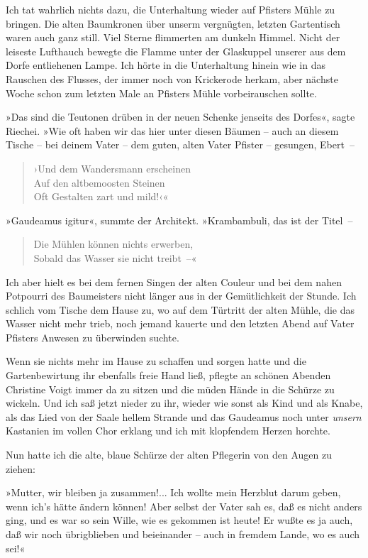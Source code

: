 Ich tat wahrlich nichts dazu, die Unterhaltung wieder auf Pfisters
Mühle zu bringen. Die alten Baumkronen über unserm vergnügten,
letzten Gartentisch waren auch ganz still. Viel Sterne flimmerten
am dunkeln Himmel. Nicht der leiseste Lufthauch bewegte die Flamme
unter der Glaskuppel unserer aus dem Dorfe entliehenen Lampe. Ich
hörte in die Unterhaltung hinein wie in das Rauschen des Flusses,
der immer noch von Krickerode herkam, aber nächste Woche schon zum
letzten Male an Pfisters Mühle vorbeirauschen sollte.

»Das sind die Teutonen drüben in der neuen Schenke jenseits des
Dorfes«, sagte Riechei. »Wie oft haben wir das hier unter diesen
Bäumen – auch an diesem Tische – bei deinem Vater – dem guten,
alten Vater Pfister – gesungen, Ebert~–

\begin{verse}
›Und dem Wandersmann erscheinen\\
Auf den altbemoosten Steinen\\
Oft Gestalten zart und mild!‹«
\end{verse}

»Gaudeamus igitur«, summte der Architekt. »Krambambuli, das ist der
Titel~–

\begin{verse}
Die Mühlen können nichts erwerben,\\
Sobald das Wasser sie nicht treibt~–«
\end{verse}

Ich aber hielt es bei dem fernen Singen der alten Couleur und bei
dem nahen Potpourri des Baumeisters nicht länger aus in der
Gemütlichkeit der Stunde. Ich schlich vom Tische dem Hause zu, wo
auf dem Türtritt der alten Mühle, die das Wasser nicht mehr trieb,
noch jemand kauerte und den letzten Abend auf Vater Pfisters
Anwesen zu überwinden suchte.

Wenn sie nichts mehr im Hause zu schaffen und sorgen hatte und die
Gartenbewirtung ihr ebenfalls freie Hand ließ, pflegte an schönen
Abenden Christine Voigt immer da zu sitzen und die müden Hände in
die Schürze zu wickeln. Und ich saß jetzt nieder zu ihr, wieder wie
sonst als Kind und als Knabe, als das Lied von der Saale hellem
Strande und das Gaudeamus noch unter \emph{unsern} Kastanien im
vollen Chor erklang und ich mit klopfendem Herzen horchte.

Nun hatte ich die alte, blaue Schürze der alten Pflegerin von den
Augen zu ziehen:

»Mutter, wir bleiben ja zusammen!... Ich wollte mein Herzblut darum
geben, wenn ich's hätte ändern können! Aber selbst der Vater sah
es, daß es nicht anders ging, und es war so sein Wille, wie es
gekommen ist heute! Er wußte es ja auch, daß wir noch übrigblieben
und beieinander – auch in fremdem Lande, wo es auch sei!«

